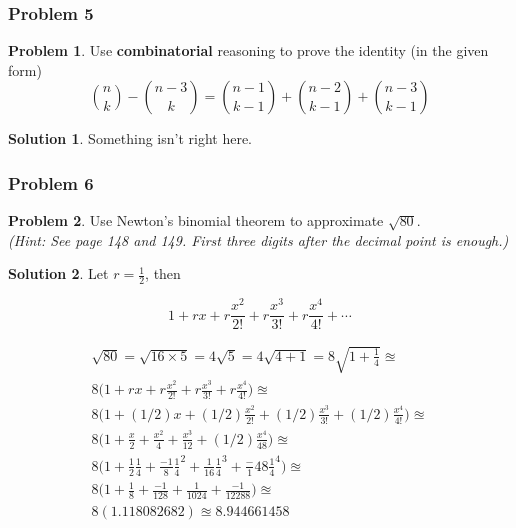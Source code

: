\documentclass[10pt,a4paper,titlepage,twoside,draft]{article}
\theoremstyle{plain}
\theoremstyle{definition}
\newtheorem*{prob}{Problem}
\newtheorem*{sol}{Solution}
\theoremstyle{remark}
\begin{document}


\subsubsection{Problem 5}
\begin{prob}
Use \textbf{combinatorial} reasoning to prove the identity (in the given form)
\[ \binom{n}{k} - \binom{n-3}{k} = \binom{n-1}{k-1} + \binom{n-2}{k-1} + \binom{n-3}{k-1} \]
\end{prob}

\medskip

\begin{sol}
Something isn’t right here.
\end{sol}

\subsubsection{Problem 6}

\begin{prob}
Use Newton's binomial theorem to approximate $\sqrt{80}$.\\
\emph{(Hint: See page 148 and 149. First three digits after the decimal point is enough.)}
\end{prob}

\medskip

\begin{sol}
Let $r = \frac{1}{2}$, then 

\[ 1 + rx + r\frac{x^{2}}{2!} + r \frac{x^{3}}{3!} + r \frac{x^{4}}{4!} + \cdots \]

\begin{eqnarray}
\sqrt{80} = \sqrt{16 \times 5} = 4 \sqrt{5} = 4 \sqrt{4+1} = 8 \sqrt{1 + \frac{1}{4}} \approxeq \\
8 \bigg ( 1 + rx + r\frac{x^{2}}{2!} + r \frac{x^{3}}{3!} + r \frac{x^{4}}{4!} \bigg ) \approxeq \\
8 \bigg ( 1 + (1/2)x + (1/2)\frac{x^{2}}{2!} + (1/2) \frac{x^{3}}{3!} + (1/2) \frac{x^{4}}{4!} \bigg ) \approxeq \\
8 \bigg ( 1 + \frac{x}{2} + \frac{x^{2}}{4} + \frac{x^{3}}{12} + (1/2) \frac{x^{4}}{48} \bigg ) \approxeq  \\
8 \bigg ( 1 + \frac{1}{2} \frac{1}{4} + \frac{-1}{8} \frac{1}{4}^{2} + \frac{1}{16} \frac{1}{4}^{3} + \frac-{1}{48} \frac{1}{4}^{4} \bigg ) \approxeq \\
8 \bigg ( 1 + \frac{1}{8} + \frac{-1}{128} + \frac{1}{1024} + \frac{-1}{12288} \bigg) \approxeq \\
8(1.118082682) \approxeq 8.944661458
\end{eqnarray}
\end{sol}
\end{document}
